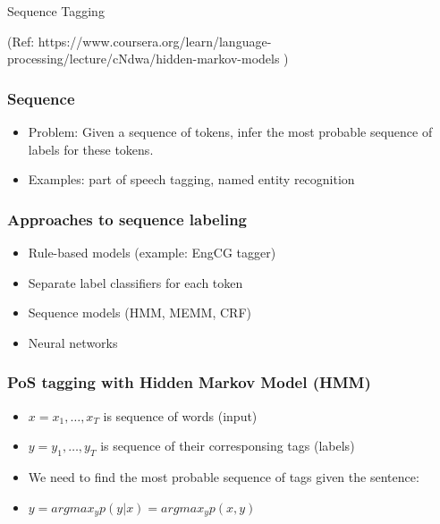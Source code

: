 \begin{frame}[fragile]\frametitle{}

\begin{center}
{\Large Sequence Tagging}

(Ref: https://www.coursera.org/learn/language-processing/lecture/cNdwa/hidden-markov-models )
\end{center}
\end{frame}


\begin{frame}[fragile]
  \frametitle{Sequence}
  \begin{itemize}
  \item Problem: Given a sequence of tokens, infer the most probable 
sequence of labels for these tokens. 
\item Examples: part of speech tagging, named entity recognition 
  	  \end{itemize}
 \end{frame} 


\begin{frame}[fragile]
  \frametitle{Approaches to sequence labeling}
  \begin{itemize}
  \item Rule-based models (example: EngCG tagger)
  \item Separate label classifiers for each token
  \item Sequence models (HMM, MEMM, CRF)
  \item Neural networks
  	  \end{itemize}
 \end{frame} 
 
 
\begin{frame}[fragile]
  \frametitle{PoS tagging with Hidden Markov Model (HMM)}
  \begin{itemize}
  \item $x = x_1,\ldots,x_T$ is sequence of words (input)
    \item $y = y_1,\ldots,y_T$ is sequence of their corresponsing tags (labels)
    \item We need to find the most probable sequence of tags given 
the sentence:
\item  $y = argmax_y p(y|x) = argmax_yp(x,y)$  
  	  \end{itemize}
 \end{frame} 

